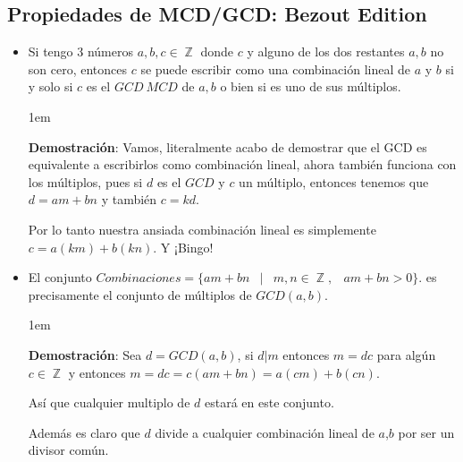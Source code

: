 \documentclass[12pt, fleqn]{report}                             %
\newenvironment{SmallIndentation}[1][0.75em]                    %
    {\begin{adjustwidth}{#1}{}\begin{footnotesize}}                 %
    {\end{footnotesize}\end{adjustwidth}}                           %
\DeclareMathOperator \Space {\quad}                             %
\DeclareMathOperator \MiniSpace {\;}                            %
\newcommand \Such {\MiniSpace|\MiniSpace}                       %
\DeclareMathOperator \Integers  {\mathbb{Z}}                     %
\begin{document}
        \clearpage
        \subsection{Propiedades de MCD/GCD: Bezout Edition}
            \begin{itemize}

                \item Si tengo 3 números $a, b, c \in \Integers$ donde $c$ y alguno de los
                dos restantes $a,b$ no son cero, entonces $c$ se puede escribir como
                una combinación lineal de $a$ y $b$ si y solo si $c$ es el $GCD \ MCD$ de
                $a, b$ o bien si es uno de sus múltiplos.

                    \begin{SmallIndentation}[1em]
                        \textbf{Demostración}:
                            Vamos, literalmente acabo de demostrar que el GCD es equivalente
                            a escribirlos como combinación lineal, ahora también funciona con
                            los múltiplos, pues si $d$ es el $GCD$ y $c$ un múltiplo, entonces
                            tenemos que $d=am+bn$ y también $c=kd$.

                            Por lo tanto nuestra ansiada combinación lineal es simplemente
                            $c=a(km)+b(kn)$. Y ¡Bingo!

                    \end{SmallIndentation} 


                \item El conjunto $Combinaciones = \{ am+bn \Such m, n \in \Integers, \MiniSpace am+bn > 0 \}$.
                es precisamente el conjunto de múltiplos de $GCD(a,b)$.

                    \begin{SmallIndentation}[1em]
                        \textbf{Demostración}:
                            Sea $d=GCD(a,b)$, si $d|m$ entonces $m = dc$ para algún $c \in \Integers$
                            y entonces $m = dc = c(am+bn)=a(cm)+b(cn)$.

                            Así que cualquier multiplo de $d$ estará en este conjunto.

                            Además es claro que $d$ divide a cualquier combinación lineal
                            de $a$,$b$ por ser un divisor común.


\end{SmallIndentation}
\end{itemize}
\end{document}
